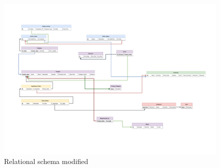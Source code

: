 \begin{figure}
\centering
\includegraphics[width=\textwidth,height=\textheight,keepaspectratio]{Schemas/LogicRS_modified.drawio.pdf}
\caption{Relational schema modified}
\label{ls_modified}
\end{figure}